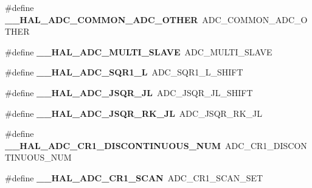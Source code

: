 \begin{DoxyCompactItemize}
\item 
\mbox{\label{group___h_a_l___a_d_c___aliased___macros_gafa9bcc01aa0b2a887721e8971031ad0b}} 
\#define {\bfseries \+\_\+\+\_\+\+H\+A\+L\+\_\+\+A\+D\+C\+\_\+\+C\+O\+M\+M\+O\+N\+\_\+\+A\+D\+C\+\_\+\+O\+T\+H\+ER}~A\+D\+C\+\_\+\+C\+O\+M\+M\+O\+N\+\_\+\+A\+D\+C\+\_\+\+O\+T\+H\+ER
\item 
\mbox{\label{group___h_a_l___a_d_c___aliased___macros_gaeff1a570027a91c87a339fd79704c3d2}} 
\#define {\bfseries \+\_\+\+\_\+\+H\+A\+L\+\_\+\+A\+D\+C\+\_\+\+M\+U\+L\+T\+I\+\_\+\+S\+L\+A\+VE}~A\+D\+C\+\_\+\+M\+U\+L\+T\+I\+\_\+\+S\+L\+A\+VE
\item 
\mbox{\label{group___h_a_l___a_d_c___aliased___macros_ga27072f37b7d50adad434a681331755f0}} 
\#define {\bfseries \+\_\+\+\_\+\+H\+A\+L\+\_\+\+A\+D\+C\+\_\+\+S\+Q\+R1\+\_\+L}~A\+D\+C\+\_\+\+S\+Q\+R1\+\_\+\+L\+\_\+\+S\+H\+I\+FT
\item 
\mbox{\label{group___h_a_l___a_d_c___aliased___macros_ga8764a28e2bb7d6a859fc52074e2ec1ec}} 
\#define {\bfseries \+\_\+\+\_\+\+H\+A\+L\+\_\+\+A\+D\+C\+\_\+\+J\+S\+Q\+R\+\_\+\+JL}~A\+D\+C\+\_\+\+J\+S\+Q\+R\+\_\+\+J\+L\+\_\+\+S\+H\+I\+FT
\item 
\mbox{\label{group___h_a_l___a_d_c___aliased___macros_ga51b8c1d68c48edfa958f988845d2ea41}} 
\#define {\bfseries \+\_\+\+\_\+\+H\+A\+L\+\_\+\+A\+D\+C\+\_\+\+J\+S\+Q\+R\+\_\+\+R\+K\+\_\+\+JL}~A\+D\+C\+\_\+\+J\+S\+Q\+R\+\_\+\+R\+K\+\_\+\+JL
\item 
\mbox{\label{group___h_a_l___a_d_c___aliased___macros_gab00342d0ece8deb8900df22b5193377e}} 
\#define {\bfseries \+\_\+\+\_\+\+H\+A\+L\+\_\+\+A\+D\+C\+\_\+\+C\+R1\+\_\+\+D\+I\+S\+C\+O\+N\+T\+I\+N\+U\+O\+U\+S\+\_\+\+N\+UM}~A\+D\+C\+\_\+\+C\+R1\+\_\+\+D\+I\+S\+C\+O\+N\+T\+I\+N\+U\+O\+U\+S\+\_\+\+N\+UM
\item 
\mbox{\label{group___h_a_l___a_d_c___aliased___macros_gae645d58040b162666fa506aeb3728f49}} 
\#define {\bfseries \+\_\+\+\_\+\+H\+A\+L\+\_\+\+A\+D\+C\+\_\+\+C\+R1\+\_\+\+S\+C\+AN}~A\+D\+C\+\_\+\+C\+R1\+\_\+\+S\+C\+A\+N\+\_\+\+S\+ET

\end{DoxyCompactItemize}

